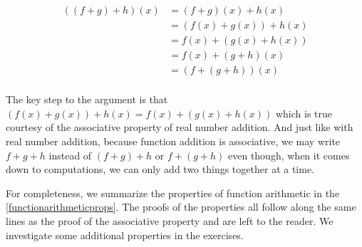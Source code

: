 \begin{align*}
((f+g)+h)(x) & = (f+g)(x)+h(x) \tag{definiton of $((f+g)+h)(x)$} \\
& = (f(x)+g(x))+h(x) \tag{definition of $(f+g)(x)$} \\
& = f(x) + (g(x)+h(x)) \tag{associative property of real number addition} \\
& = f(x) + (g+h)(x) \tag{definition of $(g+h)(x)$} \\
& = (f+(g+h))(x) \tag{definition of $(f+(g+h))(x)$} \\
\end{align*}

The key step  to the argument is that  $(f(x)+g(x))+h(x)   =  f(x) + (g(x)+h(x))$ which is true courtesy of the associative property of real number addition.  And just like with real number addition, because function addition is associative, we may write $f+g+h$ instead of $(f+g)+h$ or $f+(g+h)$ even though, when it comes down to computations, we can only add two things together at a time.

For completeness, we summarize the properties of function arithmetic in the \autoref{functionarithmeticprops}.  The proofs of the properties all follow along the same lines as the proof of the associative property and are left to the reader.  We investigate some additional properties in the exercises.

